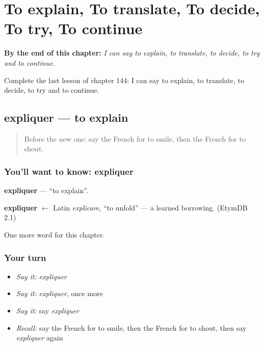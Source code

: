 
\chapter{To explain, To translate, To decide, To try, To continue}
\label{ch:fr-to-explain-to-translate-to-decide-to-try-to-continue}

\begin{chapteropening}
\textbf{By the end of this chapter:} \emph{I can say to explain, to translate, to decide, to try and to continue.}

Complete the last lesson of chapter 144: I can say to explain, to translate, to decide, to try and to continue.
\end{chapteropening}

\section[expliquer]{expliquer — to explain}

\label{lesson:FR-C144-expliquer}



\begin{quote}
Before the new one: say the French for to smile, then the French for to shout.
\end{quote}

\subsection*{You'll want to know: expliquer}
\textbf{expliquer} — \textquotedblleft{}to explain\textquotedblright{}.

\begin{cousinweb}
\textbf{expliquer} $\leftarrow$ Latin \emph{explicare}, \textquotedblleft{}to unfold\textquotedblright{} — a learned borrowing. (EtymDB 2.1)
\end{cousinweb}

\begin{grammarlens}[title={What you've built}]
One more word for this chapter.
\end{grammarlens}

\subsection*{Your turn}
\begin{itemize}
\raggedright
  \item \emph{Say it:} \emph{expliquer}
  \item \emph{Say it:} \emph{expliquer}, once more
  \item \emph{Say it:} say \emph{expliquer}
  \item \emph{Recall:} say the French for to smile, then the French for to shout, then say \emph{expliquer} again
\end{itemize}

